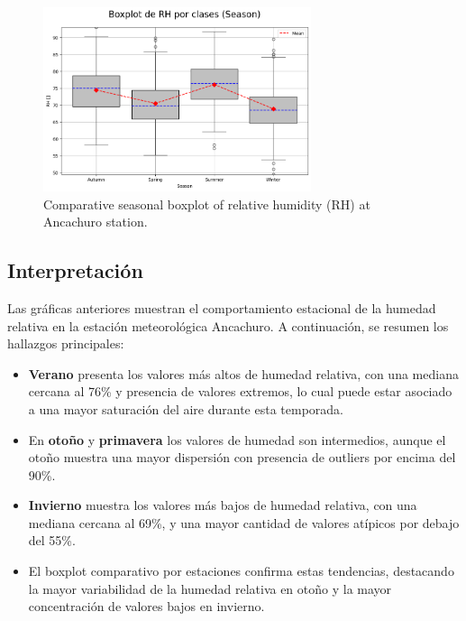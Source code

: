 \vspace{0.2cm}

\begin{figure}[htbp]
\centering
\includegraphics[width=0.7\textwidth]{resultados/por_estacion_del_anio/boxplot_clases_por_estacion/Ancachuro/RH_ClassBoxplot_Season.png}
\caption{Comparative seasonal boxplot of relative humidity (RH) at Ancachuro station.}
\label{fig:ancachuro_rh_box}
\end{figure}

\subsection*{Interpretación}

Las gráficas anteriores muestran el comportamiento estacional de la humedad relativa en la estación meteorológica Ancachuro. A continuación, se resumen los hallazgos principales:

\begin{itemize}
    \item \textbf{Verano} presenta los valores más altos de humedad relativa, con una mediana cercana al 76\% y presencia de valores extremos, lo cual puede estar asociado a una mayor saturación del aire durante esta temporada.
    \item En \textbf{otoño} y \textbf{primavera} los valores de humedad son intermedios, aunque el otoño muestra una mayor dispersión con presencia de outliers por encima del 90\%.
    \item \textbf{Invierno} muestra los valores más bajos de humedad relativa, con una mediana cercana al 69\%, y una mayor cantidad de valores atípicos por debajo del 55\%.
    \item El boxplot comparativo por estaciones confirma estas tendencias, destacando la mayor variabilidad de la humedad relativa en otoño y la mayor concentración de valores bajos en invierno.
\end{itemize}



